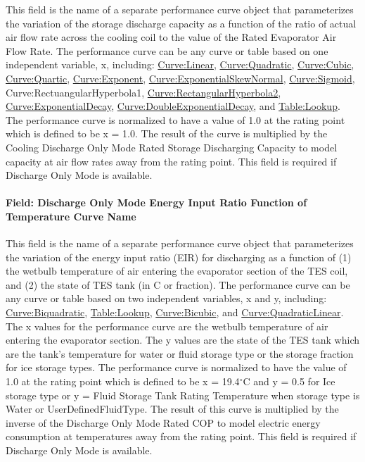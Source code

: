 This field is the name of a separate performance curve object that parameterizes the variation of the storage discharge capacity as a function of the ratio of actual air flow rate across the cooling coil to the value of the Rated Evaporator Air Flow Rate. The performance curve can be any curve or table based on one independent variable, x, including: \hyperref[curvelinear]{Curve:Linear}, \hyperref[curvequadratic]{Curve:Quadratic}, \hyperref[curvecubic]{Curve:Cubic}, \hyperref[curvequartic]{Curve:Quartic}, \hyperref[curveexponent]{Curve:Exponent}, \hyperref[curveexponentialskewnormal]{Curve:ExponentialSkewNormal}, \hyperref[curvesigmoid]{Curve:Sigmoid}, Curve:RectuangularHyperbola1, \hyperref[curverectangularhyperbola2]{Curve:RectangularHyperbola2}, \hyperref[curveexponentialdecay]{Curve:ExponentialDecay}, \hyperref[curvedoubleexponentialdecay]{Curve:DoubleExponentialDecay}, and \hyperref[tablelookup]{Table:Lookup}. The performance curve is normalized to have a value of 1.0 at the rating point which is defined to be x = 1.0. The result of the curve is multiplied by the Cooling Discharge Only Mode Rated Storage Discharging Capacity to model capacity at air flow rates away from the rating point. This field is required if Discharge Only Mode is available.

\paragraph{Field: Discharge Only Mode Energy Input Ratio Function of Temperature Curve Name}\label{field-discharge-only-mode-energy-input-ratio-function-of-temperature-curve-name}

This field is the name of a separate performance curve object that parameterizes the variation of the energy input ratio (EIR) for discharging as a function of (1) the wetbulb temperature of air entering the evaporator section of the TES coil, and (2) the state of TES tank (in C or fraction). The performance curve can be any curve or table based on two independent variables, x and y, including: \hyperref[curvebiquadratic]{Curve:Biquadratic}, \hyperref[tablelookup]{Table:Lookup}, \hyperref[curvebicubic]{Curve:Bicubic}, and \hyperref[curvequadraticlinear]{Curve:QuadraticLinear}. The x values for the performance curve are the wetbulb temperature of air entering the evaporator section. The y values are the state of the TES tank which are the tank's temperature for water or fluid storage type or the storage fraction for ice storage types. The performance curve is normalized to have the value of 1.0 at the rating point which is defined to be x = 19.4$^\circ$C and y = 0.5 for Ice storage type or y = Fluid Storage Tank Rating Temperature when storage type is Water or UserDefinedFluidType. The result of this curve is multiplied by the inverse of the Discharge Only Mode Rated COP to model electric energy consumption at temperatures away from the rating point. This field is required if Discharge Only Mode is available.

